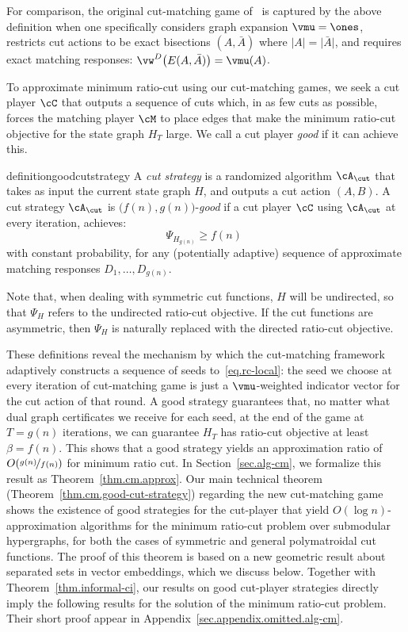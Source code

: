 \documentclass[letterpaper]{article}
\begin{document}
\noindent
For comparison, the original cut-matching game of~\cite{khandekarGraphPartitioningUsing2009} is captured by the above definition when one specifically considers graph expansion $\vmu = \ones$, restricts cut actions to be exact bisections $(A, \bar{A})$ where $\lvert A \rvert = \lvert \bar{A} \rvert$, and requires exact matching responses: $\vw^D\big( E(A, \bar{A}) \big) = \vmu(A)$.

To approximate minimum ratio-cut using our cut-matching games, we seek a cut player $\cC$ that outputs a sequence of cuts which, in as few cuts as possible, forces the matching player $\cM$ to place edges that make the minimum ratio-cut objective for the state graph $H_T$ large. We call a cut player \emph{good} if it can achieve this.

\begin{restatable}{definition}{goodcutstrategy}
\label{def.good-cut-strategy}
A \emph{cut strategy} is a randomized algorithm $\cA_{\cut}$ that takes as input the current state graph $H$, and outputs a cut action $(A, B)$. A cut strategy $\cA_{\cut}$ is $\big( f(n), g(n) \big)$-\emph{good} if a cut player $\cC$ using $\cA_{\cut}$ at every iteration, achieves:
$$
\Psi_{H_{g(n)}} \geq f(n) \, \,
$$
with constant probability, for any (potentially adaptive) sequence of approximate matching responses $D_1, \ldots, D_{g(n)}$.
\end{restatable}

Note that, when dealing with symmetric cut functions, $H$ will be undirected, so that  $\Psi_H$ refers to the undirected ratio-cut objective.  If the cut functions are asymmetric, then $\Psi_H$ is naturally replaced with the directed ratio-cut objective.


These definitions reveal the mechanism by which the cut-matching framework adaptively constructs a sequence of seeds to~\eqref{eq.rc-local}: the seed we choose at every iteration of cut-matching game is just a $\vmu$-weighted indicator vector for the cut action of that round. A good strategy guarantees that, no matter what dual graph certificates we receive for each seed, at the end of the game at $T=g(n)$ iterations, we can guarantee $H_T$ has ratio-cut objective at least $\beta = f(n)$. This shows that a good strategy yields an approximation ratio of $O(\nicefrac{g(n)}{f(n)})$
for minimum ratio cut. In Section~\ref{sec.alg-cm}, we formalize this result as Theorem~\ref{thm.cm.approx}.
Our main technical theorem (Theorem~\ref{thm.cm.good-cut-strategy}) regarding the new cut-matching game shows the existence of good strategies for the cut-player that yield $O(\log n)$-approximation algorithms for the minimum ratio-cut problem over submodular hypergraphs, for both the cases of symmetric and general polymatroidal cut functions. The proof of this theorem is based on a new geometric result about separated sets in vector embeddings, which we discuss below.
Together with Theorem~\ref{thm.informal-ci}, our results on good cut-player strategies directly imply the following results for the solution of the minimum ratio-cut problem. Their short proof appear in Appendix~\ref{sec.appendix.omitted.alg-cm}.
\end{document}
